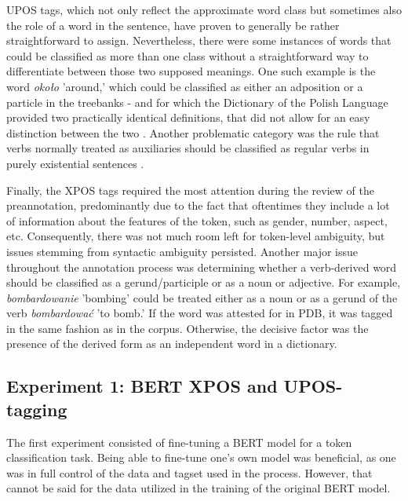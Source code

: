 UPOS tags, which not only reflect the approximate word class but sometimes also the role of a word in the sentence, have proven to generally be rather straightforward to assign. Nevertheless, there were some instances of words that could be classified as more than one class without a straightforward way to differentiate between those two supposed meanings. One such example is the word \textit{około} 'around,' which could be classified as either an adposition or a particle in the treebanks - and for which the Dictionary of the Polish Language provided two practically identical definitions, that did not allow for an easy distinction between the two \citep{okolopwn}. Another problematic category was the rule that verbs normally treated as auxiliaries should be classified as regular verbs in purely existential sentences \citep{polishud}. 

Finally, the XPOS tags required the most attention during the review of the preannotation, predominantly due to the fact that oftentimes they include a lot of information about the features of the token, such as gender, number, aspect, etc. Consequently, there was not much room left for token-level ambiguity, but issues stemming from syntactic ambiguity persisted. Another major issue throughout the annotation process was determining whether a verb-derived word should be classified as a gerund/participle or as a noun or adjective. For example, \textit{bombardowanie} 'bombing' could be treated either as a noun or as a gerund of the verb \textit{bombardować} 'to bomb.' If the word was attested for in PDB, it was tagged in the same fashion as in the corpus. Otherwise, the decisive factor was the presence of the derived form as an independent word in a dictionary.  

\subsection{Experiment 1: BERT XPOS and UPOS-tagging}
\label{subsec:bert-tagging}

The first experiment consisted of fine-tuning a BERT model for a token classification task. Being able to fine-tune one's own model was beneficial, as one was in full control of the data and tagset used in the process. However, that cannot be said for the data utilized in the training of the original BERT model. 

